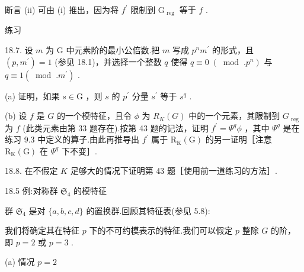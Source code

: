 \documentclass[10pt]{article}
\begin{document}
断言 (ii) 可由 (i) 推出，因为将 \({f}^{\prime }\) 限制到 \({\mathrm{G}}_{\text{ reg }}\) 等于 \(f\) .

练习

18.7. 设 \(m\) 为 G 中元素阶的最小公倍数.把 \(m\) 写成 \({p}^{n}{m}^{\prime }\) 的形式，且 \(\left( {p,{m}^{\prime }}\right)  = 1\) (参见 18.1)，并选择一个整数 \(q\) 使得 \(q \equiv  0 \; \left( {{\;\operatorname{mod}\;.}{p}^{n}}\right)\) 与 \(q \equiv  1\left( {{\;\operatorname{mod}\;.}{m}^{\prime }}\right)\) .

(a) 证明，如果 \(s \in  \mathrm{G}\) ，则 \(s\) 的 \({p}^{\prime }\) 分量 \({s}^{\prime }\) 等于 \({s}^{q}\) .

(b) 设 \(f\) 是 \(G\) 的一个模特征，且令 \(\phi\) 为 \({R}_{K}\left( G\right)\) 中的一个元素，其限制到 \({G}_{\text{ reg }}\) 为 \(f\) (此类元素由第 33 题存在).按第 43 题的记法，证明 \({f}^{\prime } = {\Psi }^{q}\phi\) ，其中 \({\Psi }^{q}\) 是在练习 9.3 中定义的算子.由此再推导出 \({f}^{\prime }\) 属于 \({\mathrm{R}}_{\mathrm{K}}\left( \mathrm{G}\right)\) 的另一证明［注意 \({\mathrm{R}}_{\mathrm{K}}\left( \mathrm{G}\right)\) 在 \({\Psi }^{q}\) 下不变］.

18.8. 在不假定 \(K\) 足够大的情况下证明第 43 题［使用前一道练习的方法］.

18.5 例:对称群 \({\mathfrak{S}}_{4}\) 的模特征

群 \({\mathfrak{S}}_{4}\) 是对 \(\{ a,b,c,d\}\) 的置换群.回顾其特征表(参见 5.8):

\begin{center}
\end{center}

我们将确定其在特征 \(p\) 下的不可约模表示的特征.我们可以假定 \(p\) 整除 \(G\) 的阶，即 \(p = 2\) 或 \(p = 3\) .

(a) 情况 \(p = 2\)
\end{document}

